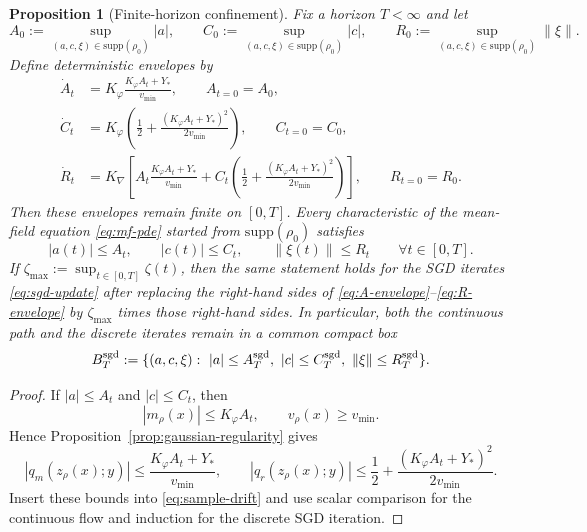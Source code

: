 \documentclass[11pt]{article}
\newtheorem{proposition}[theorem]{Proposition}
\theoremstyle{definition}
\newcommand{\supp}{\mathrm{supp}}
\newcommand{\norm}[1]{\left\lVert #1 \right\rVert}
\newcommand{\abs}[1]{\left\lvert #1 \right\rvert}
\begin{document}
\begin{proposition}[Finite-horizon confinement]
\label{prop:confinement}
Fix a horizon $T<\infty$ and let
\[
  A_0:=\sup_{(a,c,\xi)\in\supp(\rho_0)}\abs{a},
  \qquad
  C_0:=\sup_{(a,c,\xi)\in\supp(\rho_0)}\abs{c},
  \qquad
  R_0:=\sup_{(a,c,\xi)\in\supp(\rho_0)}\norm{\xi}.
\]
Define deterministic envelopes by
\begin{align}
  \dot A_t
  &=
  K_\varphi\frac{K_\varphi A_t+Y_\ast}{v_{\min}},
  \qquad
  A_{t=0}=A_0,
  \label{eq:A-envelope}
  \\
  \dot C_t
  &=
  K_\varphi\left(
    \frac12+\frac{(K_\varphi A_t+Y_\ast)^2}{2v_{\min}}
  \right),
  \qquad
  C_{t=0}=C_0,
  \label{eq:C-envelope}
  \\
  \dot R_t
  &=
  K_{\nabla}
  \left[
    A_t\frac{K_\varphi A_t+Y_\ast}{v_{\min}}
    +
    C_t\left(
      \frac12+\frac{(K_\varphi A_t+Y_\ast)^2}{2v_{\min}}
    \right)
  \right],
  \qquad
  R_{t=0}=R_0.
  \label{eq:R-envelope}
\end{align}
Then these envelopes remain finite on $[0,T]$. Every characteristic of the
mean-field equation \eqref{eq:mf-pde} started from $\supp(\rho_0)$ satisfies
\[
  \abs{a(t)}\le A_t,
  \qquad
  \abs{c(t)}\le C_t,
  \qquad
  \norm{\xi(t)}\le R_t
  \qquad
  \forall t\in[0,T].
\]
If $\zeta_{\max}:=\sup_{t\in[0,T]}\zeta(t)$, then the same statement holds for
the SGD iterates \eqref{eq:sgd-update} after replacing the right-hand sides of
\eqref{eq:A-envelope}--\eqref{eq:R-envelope} by $\zeta_{\max}$ times those
right-hand sides. In particular, both the continuous path and the discrete
iterates remain in a common compact box
\[
  B_T^{\rm sgd}
  :=
  \{
    (a,c,\xi):\ \abs{a}\le A_T^{\rm sgd},\ \abs{c}\le C_T^{\rm sgd},\
    \norm{\xi}\le R_T^{\rm sgd}
  \}.
\]
\end{proposition}

\begin{proof}
If $\abs{a}\le A_t$ and $\abs{c}\le C_t$, then
\[
  \abs{m_\rho(x)}\le K_\varphi A_t,
  \qquad
  v_\rho(x)\ge v_{\min}.
\]
Hence Proposition~\ref{prop:gaussian-regularity} gives
\[
  \abs{q_m(z_\rho(x);y)}
  \le
  \frac{K_\varphi A_t+Y_\ast}{v_{\min}},
  \qquad
  \abs{q_r(z_\rho(x);y)}
  \le
  \frac12+\frac{(K_\varphi A_t+Y_\ast)^2}{2v_{\min}}.
\]
Insert these bounds into \eqref{eq:sample-drift} and use scalar comparison for
the continuous flow and induction for the discrete SGD iteration.
\end{proof}
\end{document}
